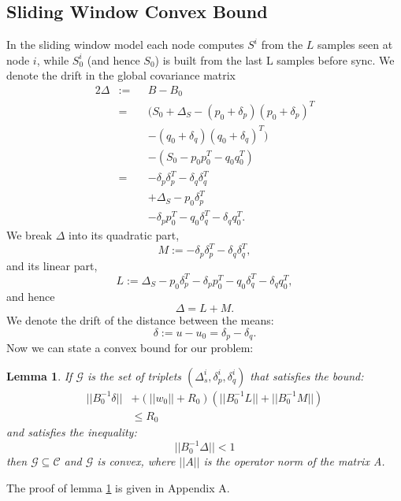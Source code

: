 \documentclass[11pt,twocolumn,varwidth=true,a4paper,fleqn]{article}
\newtheorem{lemma}{Lemma}
\begin{document}
\subsection{Sliding Window Convex Bound}
In the sliding window model each node computes $S^i$ from the $L$ samples seen
at node $i$, while $S_0^i$ (and hence $S_0$) is built from the last L samples before
sync. 
We denote the drift in the global covariance matrix
\begin{alignat*}{2}
\Delta & := && B-B_0 \\
& = && (S_0+\Delta_S - (p_0+\delta_p)(p_0+\delta_p)^T \\
& && - (q_0+\delta_q)(q_0+\delta_q)^T) \\
& && - (S_0 - p_0p_0^T - q_0q_0^T) \\
& = && - \delta_p\delta_p^T - \delta_q\delta_q^T \\
& && + \Delta_S - p_0\delta_p^T \\
& && - \delta_pp_0^T - q_0\delta_q^T - \delta_qq_0^T.
\end{alignat*}
We break $\Delta$ into its quadratic part,
\begin{equation*}
M:= - \delta_p\delta_p^T - \delta_q\delta_q^T, 
\end{equation*}
and its linear part,
\begin{equation*}
L:= \Delta_S - p_0\delta_p^T - \delta_pp_0^T - q_0\delta_q^T - \delta_qq_0^T, 
\end{equation*}
and hence 
\begin{equation*}
\Delta= L+ M.
\end{equation*}
We denote the drift of the distance between the means:
\begin{equation*}
\delta:= u-u_0 = \delta_p - \delta_q.
\end{equation*}
Now we can state a convex bound for our problem:
\begin{lemma} \label{convexBound}
If $\mathcal{G}$ is the set of triplets $(\Delta_s^i, \delta_p^i, \delta_q^i)$
 that satisfies the bound:
 \begin{equation} \label{eq:convexBound}
\begin{split}
||B_0^{-1}\delta|| &+ (||w_0||+R_0)(||B_0^{-1}L||+||B_0^{-1}M||) \\ & \leq  R_0
\end{split}
\end{equation}
and satisfies the inequality:
 \begin{equation*} 
||B_0^{-1}\Delta|| < 1
\end{equation*}
 then $\mathcal{G}
 \subseteq \mathcal{C}$ and $\mathcal{G}$ is convex, where $||A||$ is the
 operator norm of the matrix A.
\end{lemma}
The proof of lemma \ref{convexBound} is given in Appendix A.
\end{document}
